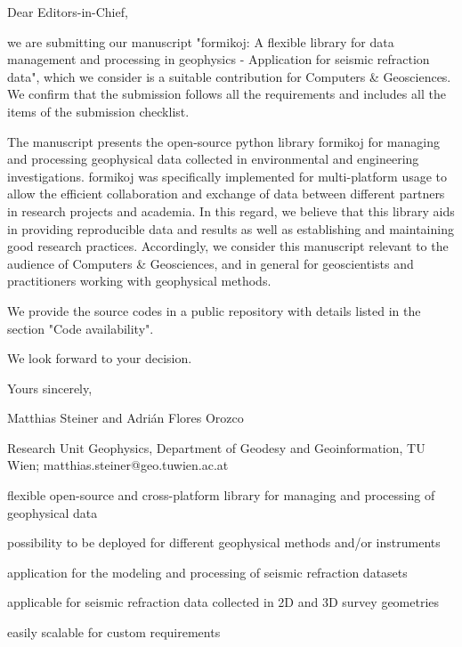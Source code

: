 \documentclass[a4paper,fleqn]{cas-sc}
\begin{document}
\begin{coverletter}

Dear Editors-in-Chief,
\newline
 
we are submitting our manuscript "formikoj: A flexible library for data management and processing in geophysics - Application for seismic refraction data", which we consider is a suitable contribution for Computers \& Geosciences. We confirm that the submission follows all the requirements and includes all the items of the submission checklist.  
\newline
 
The manuscript presents the open-source python library formikoj for managing and processing geophysical data collected in environmental and engineering investigations. formikoj was specifically implemented for multi-platform usage to allow the efficient collaboration and exchange of data between different partners in research projects and academia. In this regard, we believe that this library aids in providing reproducible data and results as well as establishing and maintaining good research practices. Accordingly, we consider this manuscript relevant to the audience of Computers \& Geosciences, and in general for geoscientists and practitioners working with geophysical methods.
\newline

We provide the source codes in a public repository with details listed in the section "Code availability".
\newline

We look forward to your decision.
\newline

Yours sincerely,
\newline

Matthias Steiner and Adrián Flores Orozco

Research Unit Geophysics, Department of Geodesy and Geoinformation, TU Wien; matthias.steiner@geo.tuwien.ac.at
\newline

\end{coverletter}
 
\begin{highlights}
\item flexible open-source and cross-platform library for managing and processing of geophysical data
\item possibility to be deployed for different geophysical methods and/or instruments
\item application for the modeling and processing of seismic refraction datasets
\item applicable for seismic refraction data collected in 2D and 3D survey geometries
\item easily scalable for custom requirements
\end{highlights}
\end{document}
